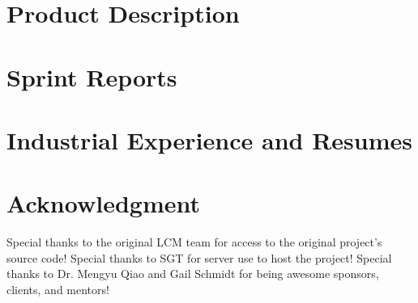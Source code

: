 \documentclass{book}
\begin{document}
\appendix

 

\chapter{Product Description}



\chapter{Sprint Reports}


\chapter{Industrial Experience and Resumes}


\chapter{Acknowledgment}
\label{SpecialThanks}  
Special thanks to the original LCM team for access to the original project's source code! Special thanks to SGT for server use to host the project! Special thanks to Dr. Mengyu Qiao and Gail Schmidt for being awesome sponsors, clients, and mentors!


\backmatter
\end{document}
